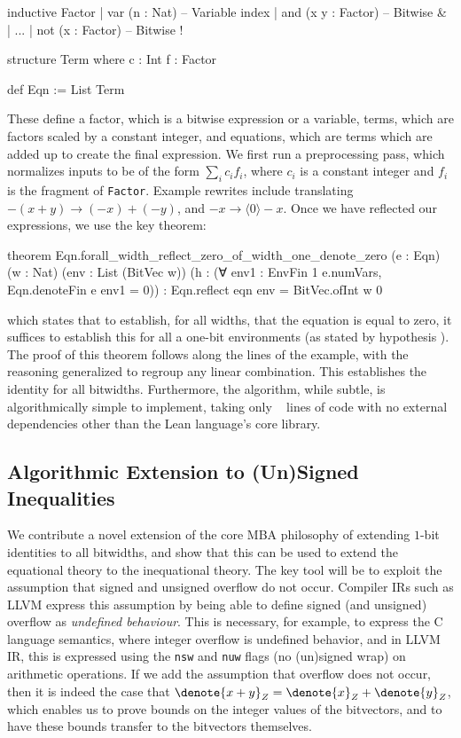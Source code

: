 \begin{lean}
inductive Factor
| var (n : Nat) -- Variable index
| and (x y : Factor) -- Bitwise &
| ...
| not (x : Factor) -- Bitwise !

structure Term where
  c : Int
  f : Factor

def Eqn := List Term
\end{lean}

These define a factor, which is a bitwise expression or a variable, terms, which are factors
scaled by a constant integer, and equations, which are terms which are added up to create
the final expression. We first run a preprocessing pass, which normalizes inputs to be of
the form $\sum_i c_i f_i$, where $c_i$ is a constant integer and $f_i$ is the fragment of \texttt{Factor}.
Example rewrites include translating $- (x + y) \to (-x) + (-y)$, and $-x \to \langle 0 \rangle - x$.
Once we have reflected our expressions, we use the key theorem:
%
\begin{lean}
theorem Eqn.forall_width_reflect_zero_of_width_one_denote_zero
    (e : Eqn) (w : Nat) (env : List (BitVec w))
    (h : (∀ env1 : EnvFin 1 e.numVars, Eqn.denoteFin e env1 = 0)) :
    Eqn.reflect eqn env = BitVec.ofInt w 0
\end{lean}
%
which states that to establish, for all widths, that the equation  is equal to zero,
it suffices to establish this for all a one-bit environments (as stated by hypothesis ).
The proof of this theorem follows along the lines of the example, with the reasoning generalized
to regroup any linear combination. This establishes the identity for all bitwidths.
Furthermore, the algorithm, while subtle, is algorithmically simple to implement,
taking only ~\MBATotalLines{} lines of code with no external dependencies other than
the Lean language's core library.

\subsection{Algorithmic Extension to (Un)Signed Inequalities}

We contribute a novel extension of the core MBA philosophy of extending $1$-bit identities to all bitwidths,
and show that this can be used to extend the equational theory to the inequational theory.
The key tool will be to exploit the assumption that signed and unsigned overflow do not occur.
Compiler IRs such as LLVM express this assumption by being able to define signed (and unsigned) overflow as \emph{undefined behaviour}.
This is necessary, for example, to express the C language semantics, where integer overflow is undefined behavior,
and in LLVM IR, this is expressed using the \texttt{nsw} and \texttt{nuw} flags (no (un)signed wrap) on arithmetic operations.
If we add the assumption that overflow does not occur, then it is indeed the case that $\denote{x + y}_Z = \denote{x}_Z + \denote{y}_Z$,
which enables us to prove bounds on the integer values of the bitvectors, and to have these bounds transfer to the bitvectors themselves.

